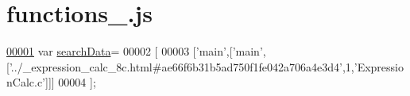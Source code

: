 \hypertarget{functions__2_8js_source}{\section{functions\+\_.\+js}
\label{functions__2_8js_source}
}

\begin{DoxyCode}
\hypertarget{functions__2_8js_source_l00001}{}\hyperlink{functions__2_8js_ad01a7523f103d6242ef9b0451861231e}{00001} var \hyperlink{functions__2_8js_ad01a7523f103d6242ef9b0451861231e}{searchData}=
00002 [
00003   [\textcolor{stringliteral}{'main'},[\textcolor{stringliteral}{'main'},[\textcolor{stringliteral}{'../\_expression\_calc\_8c.html#ae66f6b31b5ad750f1fe042a706a4e3d4'},1,\textcolor{stringliteral}{'ExpressionCalc.c'}]]]
00004 ];
\end{DoxyCode}
